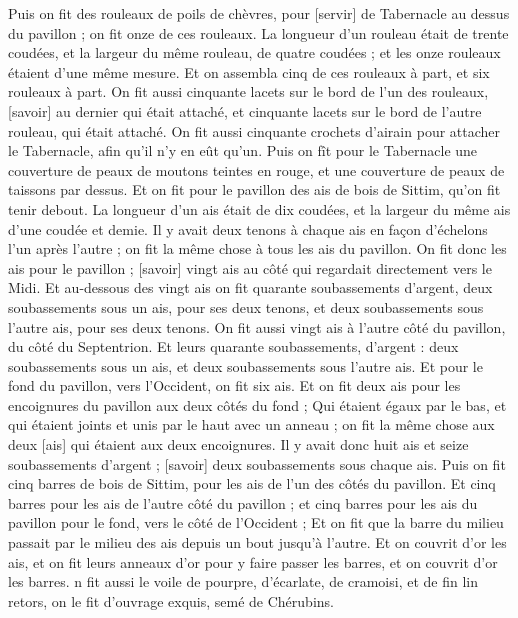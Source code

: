 \begin{multicols}{2}
Puis on fit des rouleaux de poils de chèvres, pour [servir] de Tabernacle au dessus du pavillon ; on fit onze de ces rouleaux.
La longueur d'un rouleau était de trente coudées, et la largeur du même rouleau, de quatre coudées ; et les onze rouleaux étaient d'une même mesure.
Et on assembla cinq de ces rouleaux à part, et six rouleaux à part.
On fit aussi cinquante lacets sur le bord de l'un des rouleaux, [savoir] au dernier qui était attaché, et cinquante lacets sur le bord de l'autre rouleau, qui était attaché.
On fit aussi cinquante crochets d'airain pour attacher le Tabernacle, afin qu'il n'y en eût qu'un.
Puis on fît pour le Tabernacle une couverture de peaux de moutons teintes en rouge, et une couverture de peaux de taissons par dessus.
Et on fit pour le pavillon des ais de bois de Sittim, qu'on fit tenir debout.
La longueur d'un ais était de dix coudées, et la largeur du même ais d'une coudée et demie.
Il y avait deux tenons à chaque ais en façon d'échelons l'un après l'autre ; on fit la même chose à tous les ais du pavillon.
On fit donc les ais pour le pavillon ; [savoir] vingt ais au côté qui regardait directement vers le Midi.
Et au-dessous des vingt ais on fit quarante soubassements d'argent, deux soubassements sous un ais, pour ses deux tenons, et deux soubassements sous l'autre ais, pour ses deux tenons.
On fit aussi vingt ais à l'autre côté du pavillon, du côté du Septentrion.
Et leurs quarante soubassements, d'argent : deux soubassements sous un ais, et deux soubassements sous l'autre ais.
Et pour le fond du pavillon, vers l'Occident, on fit six ais.
Et on fit deux ais pour les encoignures du pavillon aux deux côtés du fond ;
Qui étaient égaux par le bas, et qui étaient joints et unis par le haut avec un anneau ; on fit la même chose aux deux [ais] qui étaient aux deux encoignures.
Il y avait donc huit ais et seize soubassements d'argent ; [savoir] deux soubassements sous chaque ais.
Puis on fit cinq barres de bois de Sittim, pour les ais de l'un des côtés du pavillon.
Et cinq barres pour les ais de l'autre côté du pavillon ; et cinq barres pour les ais du pavillon pour le fond, vers le côté de l'Occident ;
Et on fit que la barre du milieu passait par le milieu des ais depuis un bout jusqu’à l'autre.
Et on couvrit d'or les ais, et on fit leurs anneaux d'or pour y faire passer les barres, et on couvrit d'or les barres.
n fit aussi le voile de pourpre, d'écarlate, de cramoisi, et de fin lin retors, on le fit d'ouvrage exquis, semé de Chérubins.

\end{multicols}
